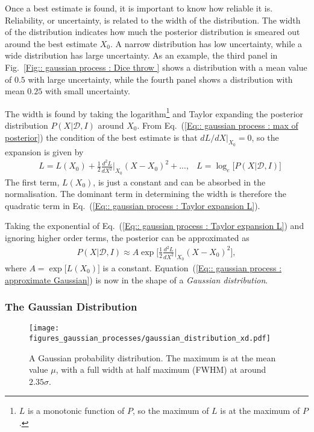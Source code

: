 \documentclass[twoside,english]{uiofysmaster}
\begin{document}
{{Once a best estimate is found, it is important to know how reliable it is. Reliability, or uncertainty, is related to the width of the distribution. The width of the distribution indicates how much the posterior distribution is smeared out around the best estimate $X_0$. A narrow distribution has low uncertainty, while a wide distribution has large uncertainty. As an example, the third panel in Fig.~\ref{Fig:: gaussian process : Dice throw } shows a distribution with a mean value of $0.5$ with large uncertainty, while the fourth panel shows a distribution with mean $0.25$ with small uncertainty. 

The width is found by taking the logarithm\footnote{$L$ is a monotonic function of $P$, so the maximum of $L$ is at the maximum of $P$.} and Taylor expanding the posterior distribution $P(X| \mathcal{D}, I)$ around $X_0$. From Eq.~(\ref{Eq:: gaussian process : max of posterior}) the condition of the best estimate is that $dL/dX|_{X_0} =0$, so the expansion is given by
\begin{align}
&L = L(X_0) + \frac{1}{2} \frac{d^2L}{dX^2}\Big|_{X_0} (X-X_0)^2 +... ,&L = \log_e \Big[P(X | \mathcal{D}, I ) \Big]\label{Eq:: gaussian process : Taylor expansion L}
\end{align}
The first term, $L(X_0)$, is just a constant and can be absorbed in the normalisation. The dominant term in determining the width is therefore the quadratic term in Eq.~(\ref{Eq:: gaussian process : Taylor expansion L}).

Taking the exponential of Eq.~(\ref{Eq:: gaussian process : Taylor expansion L}) and ignoring higher order terms, the posterior can be approximated as
\begin{align}\label{Eq:: gaussian process : approximate Gaussian}
P(X | \mathcal{D}, I) \approx A \exp \Bigg[ \frac{1}{2} \frac{d^2L}{dX^2}\Big|_{X_0} (X-X_0)^2 \Bigg], 
\end{align} 
where $A = \exp \big[L(X_0) \big]$ is a constant. Equation~(\ref{Eq:: gaussian process : approximate Gaussian}) is now in the shape of a \textit{Gaussian distribution}.


\subsubsection{The Gaussian Distribution}\label{Sec:: gaussian process : The Gaussian Distribution}

\begin{figure}
\centering
\texttt{[image: figures\_gaussian\_processes/gaussian\_distribution\_xd.pdf]}
\caption[The general Gaussian distribution]{A Gaussian probability distribution. The maximum is at the mean value $\mu$, with a full width at half maximum (FWHM) at around $2.35 \sigma$. }
\label{Fig:: gaussian process : Gaussian distribution}
\end{figure}

}}
\end{document}
